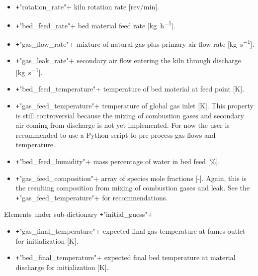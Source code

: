 \documentclass[11pt]{paper}
\begin{document}
\begin{itemize}
    \item \texttt+"rotation_rate"+
    kiln rotation rate [rev/min].
    
    \item \texttt+"bed_feed_rate"+
    bed material feed rate [\si{\kilo\gram\per\hour}].
    
    \item \texttt+"gas_flow_rate"+
    mixture of natural gas plus primary air flow rate [\si{\kilo\gram\per\second}].
    
    \item \texttt+"gas_leak_rate"+
    secondary air flow entering the kiln through discharge [\si{\kilo\gram\per\second}].
    
    \item \texttt+"bed_feed_temperature"+
    temperature of bed material at feed point [\si{\kelvin}].
    
    \item \texttt+"gas_feed_temperature"+
    temperature of global gas inlet [\si{\kelvin}]. This property is still controversial because the mixing of combustion gases and secondary air coming from discharge is not yet implemented. For now the user is recommended to use a Python script to pre-process gas flows and temperature.
    
    \item \texttt+"bed_feed_humidity"+
    mass percentage of water in bed feed [\%].
    
    \item \texttt+"gas_feed_composition"+
    array of species mole fractions [-]. Again, this is the resulting composition from mixing of combustion gases and leak. See the \texttt+"gas_feed_temperature"+ for recommendations.
\end{itemize}

\noindent{}Elements under sub-dictionary \texttt+"initial_guess"+

\begin{itemize}
	\item \texttt+"gas_final_temperature"+
	expected final gas temperature at fumes outlet for initialization [\si{\kelvin}].
	
	\item \texttt+"bed_final_temperature"+
	expected final bed temperature at material discharge for initialization [\si{\kelvin}].
\end{itemize}
\end{document}
